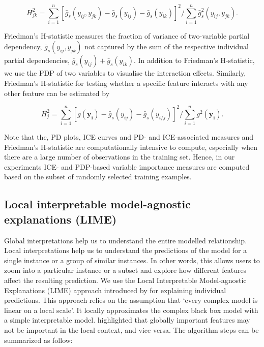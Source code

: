 \documentclass[11pt,a4paper,]{article}
\begin{document}
\[H_{jk}^2=\sum_{i=1}^{n}[\bar{g}_{s}(y_{ij}, y_{jk})-\bar{g}_{s}(y_{ij})-\bar{g}_{s}(y_{ik})]^2/\sum_{i=1}^{n}\bar{g}^2_{s}(y_{ij}, y_{jk}).\]

Friedman's H-statistic measures the fraction of variance of two-variable partial dependency, \(\bar{g}_{s}(y_{ij}, y_{jk})\) not captured by the sum of the respective individual partial dependencies, \(\bar{g}_{s}(y_{ij})+\bar{g}_{s}(y_{ik})\). In addition to Friedman's H-statistic, we use the PDP of two variables to visualise the interaction effects. Similarly, Friedman's H-statistic for testing whether a specific feature interacts with any other feature can be estimated by

\[H_{j}^2=\sum_{i=1}^{n}[{g}(\bm{y_{i}})-\bar{g}_{s}(y_{ij})-\bar{g}_{s}(y_{i/j})]^2/\sum_{i=1}^{n}g^2(\bm{y_{i}}).\]

Note that the, PD plots, ICE curves and PD- and ICE-associated measures and Friedman's H-statistic are computationally intensive to compute, especially when there are a large number of observations in the training set. Hence, in our experiments ICE- and PDP-based variable importance measures are computed based on the subset of randomly selected training examples.

\hypertarget{local-interpretable-model-agnostic-explanations-lime}{%
\subsection{Local interpretable model-agnostic explanations (LIME)}\label{local-interpretable-model-agnostic-explanations-lime}}

Global interpretations help us to understand the entire modelled relationship. Local interpretations help us to understand the predictions of the model for a single instance or a group of similar instances. In other words, this allows users to zoom into a particular instance or a subset and explore how different features affect the resulting prediction. We use the Local Interpretable Model-agnostic Explanations (LIME) approach introduced by \textcite{ribeiro2016should} for explaining individual predictions. This approach relies on the assumption that `every complex model is linear on a local scale'. It locally approximates the complex black box model with a simple interpretable model. \textcite{ribeiro2016should} highlighted that globally important features may not be important in the local context, and vice versa. The algorithm steps can be summarized as follow:
\end{document}
